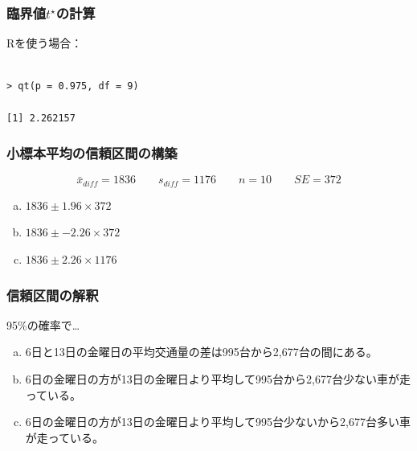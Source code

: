 
\begin{frame}[fragile]
\frametitle{臨界値$t^\star$の計算}


Rを使う場合：
\begin{verbatim}

> qt(p = 0.975, df = 9)

[1] 2.262157

\end{verbatim}

\end{frame}


\begin{frame}
\frametitle{小標本平均の信頼区間の構築}

\[ \bar{x}_{diff} = 1836 \qquad s_{diff} = 1176 \qquad n = 10 \qquad SE = 372 \]

{
\begin{enumerate}[(a)]

\item $1836 \pm 1.96 \times 372$


\item $1836 \pm -2.26 \times 372$

\item $1836 \pm 2.26 \times 1176$

\end{enumerate}
}
{
\vspace{0.25cm}
}

\end{frame}


\begin{frame}
\frametitle{信頼区間の解釈}


95\%の確率で…

\begin{enumerate}[(a)]

\item 6日と13日の金曜日の平均交通量の差は995台から2,677台の間にある。

\item 6日の金曜日の方が13日の金曜日より平均して995台から2,677台少ない車が走っている。

\item 6日の金曜日の方が13日の金曜日より平均して995台少ないから2,677台多い車が走っている。


\end{enumerate}

\end{frame}

